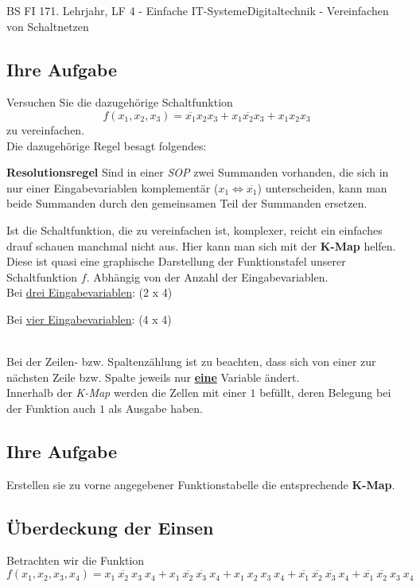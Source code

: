 \documentclass[11pt,twocolumn,oneside,openany,headings=optiontotoc,11pt,numbers=noenddot]{article}
\begin{document}
\begin{worksheet}{BS FI 17}{1. Lehrjahr, LF 4 - Einfache IT-Systeme}{Digitaltechnik - Vereinfachen von Schaltnetzen}
		\subsection*{Ihre Aufgabe} Versuchen Sie die dazugehörige Schaltfunktion \[f(x_1,x_2,x_3) = \overline{x_1}x_2x_3 + x_1\overline{x_2}x_3 + x_1x_2x_3\] zu vereinfachen.\\
		Die dazugehörige Regel besagt folgendes:
		\begin{framed} \textbf{Resolutionsregel} Sind in einer \textit{SOP} zwei Summanden vorhanden, die sich in nur einer Eingabevariablen komplementär (\(x_1 \Leftrightarrow \overline{x_1}\)) unterscheiden, kann man beide Summanden durch den gemeinsamen Teil der Summanden ersetzen.\end{framed}
		Ist die Schaltfunktion, die zu vereinfachen ist, komplexer, reicht ein einfaches drauf schauen manchmal nicht aus. Hier kann man sich mit der \textbf{K-Map} helfen. Diese ist quasi eine graphische Darstellung der Funktionstafel unserer Schaltfunktion \(f\). Abhängig von der Anzahl der Eingabevariablen.\\
		Bei \underline{drei Eingabevariablen}: (2 x 4)\\
		\par\noindent
		\begin{karnaugh-map}[4][2][1][$x_2x_3$][$x_1$]
			
		\end{karnaugh-map}
		\par\noindent
		Bei \underline{vier Eingabevariablen}: (4 x 4)\\
		\par\noindent
		\begin{karnaugh-map}[4][4][1][$x_3x_4$][$x_1x_2$]
			
		\end{karnaugh-map}\\
		Bei der Zeilen- bzw. Spaltenzählung ist zu beachten, dass sich von einer zur nächsten Zeile bzw. Spalte jeweils nur \underline{\textbf{eine}} Variable ändert.\\
		Innerhalb der \textit{K-Map} werden die Zellen mit einer \(1\) befüllt, deren Belegung bei der Funktion auch \(1\) als Ausgabe haben.
		\subsection*{Ihre Aufgabe}	Erstellen sie zu vorne angegebener Funktionstabelle die entsprechende \textbf{K-Map}.\\
		\subsection{Überdeckung der Einsen} Betrachten wir die Funktion\\
		\(f(x_1,x_2,x_3,x_4) = x_1\ \overline{x_2}\ x_3\ x_4 + x_1\ \overline{x_2}\ \overline{x_3}\ x_4 + x_1\ x_2\ x_3\ x_4 + \overline{x_1}\ \overline{x_2}\ \overline{x_3}\ x_4 + \overline{x_1}\ \overline{x_2}\ x_3\ x_4\)

\end{worksheet}
\end{document}
